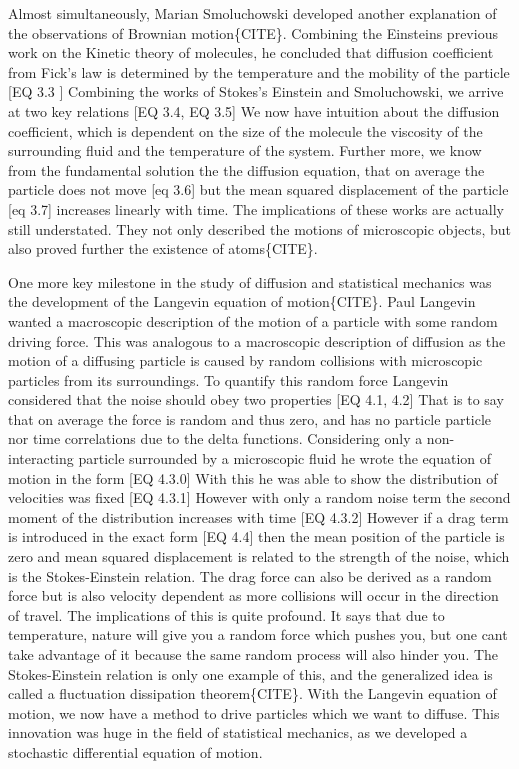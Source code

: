 \documentclass[draft, english]{volcanica-template}
\begin{document}
Almost simultaneously, Marian Smoluchowski developed another explanation of the observations of Brownian motion\{CITE\}. Combining the Einsteins previous work on the Kinetic theory of molecules, he concluded that diffusion coefficient from Fick's law is determined by the temperature and the mobility of the particle
[EQ 3.3 ]
Combining the works of Stokes's Einstein and Smoluchowski, we arrive at two key relations
[EQ 3.4, EQ 3.5]
We now have intuition about the diffusion coefficient, which is dependent on the size of the molecule  the viscosity of the surrounding fluid and the temperature of the system. Further more, we know from the fundamental solution the the diffusion equation, that on average the particle does not move
[eq 3.6]
but the mean squared displacement of the particle
[eq 3.7]
increases linearly with time. The implications of these works are actually still understated. They not only described the motions of microscopic objects, but also proved further the existence of atoms\{CITE\}.

One more key milestone in the study of diffusion and statistical mechanics was the development of the Langevin equation of motion\{CITE\}. Paul Langevin wanted a macroscopic description of the motion of a particle with some random driving force. This was analogous to a macroscopic description of diffusion as the motion of a diffusing particle is caused by random collisions with microscopic particles from its surroundings. To quantify this random force Langevin considered that the noise should obey two properties
[EQ 4.1, 4.2]
That is to say that on average the force is random and thus zero, and has no particle particle nor time correlations due to the delta functions. Considering only a non-interacting particle surrounded by a microscopic fluid he wrote the equation of motion in the form
[EQ 4.3.0]
With this he was able to show the distribution of velocities was fixed
[EQ 4.3.1]
However with only a random noise term the second moment of the distribution increases with time
[EQ 4.3.2]
However if a drag term is introduced in the exact form
[EQ 4.4]
then the mean position of the particle is zero and mean squared displacement is related to the strength of the noise, which is the Stokes-Einstein relation. The drag force can also be derived as a random force but is also velocity dependent as more collisions will occur in the direction of travel. The implications of this is quite profound. It says that due to temperature, nature will give you a random force which pushes you, but one cant take advantage of it because the same random process will also hinder you. The Stokes-Einstein relation is only one example of this, and the generalized idea is called a fluctuation dissipation theorem\{CITE\}. With the Langevin equation of motion, we now have a method to drive particles which we want to diffuse. This innovation was huge in the field of statistical mechanics, as we developed a stochastic differential equation of motion.
\end{document}
